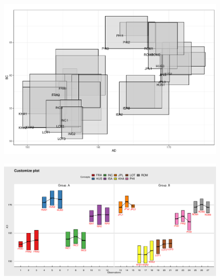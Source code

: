 \documentclass[article]{jss}
\begin{document}
\begin{appendix}
\begin{figure}[t!]
\centering
\includegraphics[width=1\textwidth]{pic/scatter} 
\caption{\label{fig:scatter}}
\end{figure}


\begin{figure}[t!]
\centering
\includegraphics[width=1\textwidth]{pic/customize} 
\caption{\label{fig:customize}}
\end{figure}




\end{appendix}
\end{document}
